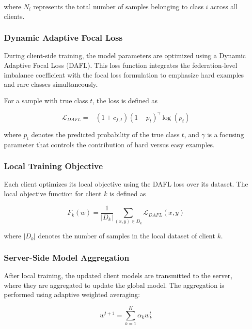 \documentclass[12pt]{book}
\begin{document}
where \(N_i\) represents the total number of samples belonging to class \(i\) across all clients.

\subsubsection{Dynamic Adaptive Focal Loss}

During client-side training, the model parameters are optimized using a Dynamic Adaptive Focal Loss (DAFL). This loss function integrates the federation-level imbalance coefficient with the focal loss formulation to emphasize hard examples and rare classes simultaneously.

For a sample with true class \(t\), the loss is defined as

\begin{equation}
\mathcal{L}_{DAFL} =
-(1 + c_{f,t})(1 - p_t)^{\gamma} \log(p_t)
\end{equation}

where \(p_t\) denotes the predicted probability of the true class \(t\), and \(\gamma\) is a focusing parameter that controls the contribution of hard versus easy examples.

\subsubsection{Local Training Objective}

Each client optimizes its local objective using the DAFL loss over its dataset. The local objective function for client \(k\) is defined as

\begin{equation}
F_k(w) =
\frac{1}{|D_k|}
\sum_{(x,y)\in D_k}
\mathcal{L}_{DAFL}(x,y)
\end{equation}

where \(|D_k|\) denotes the number of samples in the local dataset of client \(k\).

\subsubsection{Server-Side Model Aggregation}

After local training, the updated client models are transmitted to the server, where they are aggregated to update the global model. The aggregation is performed using adaptive weighted averaging:

\begin{equation}
w^{t+1} =
\sum_{k=1}^{K}
\alpha_k w_k^{t}
\end{equation}
\end{document}
